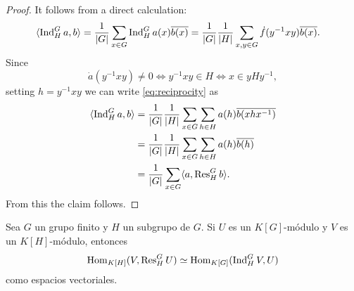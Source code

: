 \begin{proof}
    It follows from a direct calculation:
    \begin{equation}
    \label{eq:reciprocity}
    \begin{aligned}
        \langle\operatorname{Ind}_H^Ga,b\rangle 
        &= \frac{1}{|G|}\sum_{x\in G}\operatorname{Ind}_H^Ga(x)\overline{b(x)}
        = \frac{1}{|G|}\frac{1}{|H|}\sum_{x,y\in G}\dot{f}(y^{-1}xy)\overline{b(x)}.
    \end{aligned}
    \end{equation}
    Since 
    \[
    \dot{a}(y^{-1}xy)\ne 0\Longleftrightarrow
    y^{-1}xy\in H\Longleftrightarrow x\in yHy^{-1},
    \]
    setting $h=y^{-1}xy$ 
    we can write \eqref{eq:reciprocity} as 
    \begin{align*}
        \langle\operatorname{Ind}_H^Ga,b\rangle
        &=\frac{1}{|G|}\frac{1}{|H|}\sum_{x\in G}\sum_{h\in H}a(h)\overline{b(xhx^{-1})}\\
        &=\frac{1}{|G|}\frac{1}{|H|}\sum_{x\in G}\sum_{h\in H}a(h)\overline{b(h)}\\
        &=\frac{1}{|G|}\sum_{x\in G}\langle a,\operatorname{Res}_H^Gb\rangle.
    \end{align*}
    From this the claim follows. 
\end{proof}


\begin{theorem}
Sea $G$ un grupo finito y $H$ un subgrupo de $G$. 
Si $U$ es un $K[G]$-módulo y $V$ es un $K[H]$-módulo, entonces
\[
\operatorname{Hom}_{K[H]}(V,\operatorname{Res}_H^GU)\simeq \operatorname{Hom}_{K[G]}(\operatorname{Ind}_H^GV,U)
\]
como espacios vectoriales.
\end{theorem}

